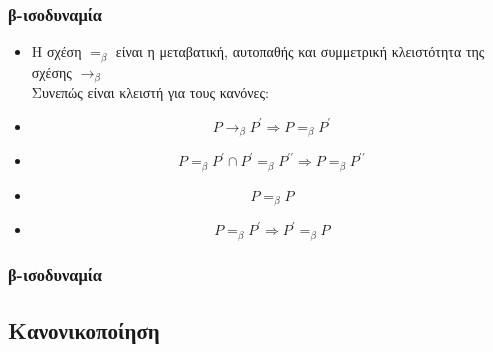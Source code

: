 \documentclass{beamer}
\begin{document}
\begin{frame}
        \frametitle{β-ισοδυναμία}
        \begin{itemize}
        	
            \item Η σχέση $ =_\beta$ είναι η μεταβατική, αυτοπαθής και συμμετρική κλειστότητα της σχέσης
                  $\rightarrow _\beta$ \\ Συνεπώς είναι κλειστή για τους κανόνες: 
            \pause
            \item $$P \rightarrow  _\beta P^\prime \Rightarrow P  =_\beta P^\prime $$
            \pause
            \item $$P  =_\beta P^\prime \cap P^\prime =_\beta P ^{\prime \prime}
                  \Rightarrow P =_\beta P ^{\prime \prime}$$
			\pause
            \item $$P =_\beta P$$
            \pause
            \item $$P  =_\beta P^\prime \Rightarrow P^\prime =_\beta P$$
            
        \end{itemize}
\end{frame}

\begin{frame}
        \frametitle{β-ισοδυναμία}
\end{frame}

\subsection{Κανονικοποίηση}
\end{document}

